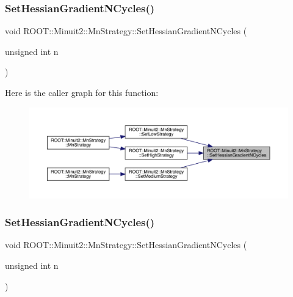 \mbox{\label{classROOT_1_1Minuit2_1_1MnStrategy_ad8984d94901eaf8cad19fe49647449bf}} 
\subsubsection{\texorpdfstring{SetHessianGradientNCycles()}{SetHessianGradientNCycles()}\hspace{0.1cm}{\footnotesize\ttfamily [1/2]}}
{\footnotesize\ttfamily void R\+O\+O\+T\+::\+Minuit2\+::\+Mn\+Strategy\+::\+Set\+Hessian\+Gradient\+N\+Cycles (\begin{DoxyParamCaption}\item[{unsigned int}]{n }\end{DoxyParamCaption})\hspace{0.3cm}{\ttfamily [inline]}}

Here is the caller graph for this function\+:\nopagebreak
\begin{figure}[H]
\begin{center}
\leavevmode
\includegraphics[width=350pt]{da/de4/classROOT_1_1Minuit2_1_1MnStrategy_ad8984d94901eaf8cad19fe49647449bf_icgraph}
\end{center}
\end{figure}
\mbox{\label{classROOT_1_1Minuit2_1_1MnStrategy_ad8984d94901eaf8cad19fe49647449bf}} 
\subsubsection{\texorpdfstring{SetHessianGradientNCycles()}{SetHessianGradientNCycles()}\hspace{0.1cm}{\footnotesize\ttfamily [2/2]}}
{\footnotesize\ttfamily void R\+O\+O\+T\+::\+Minuit2\+::\+Mn\+Strategy\+::\+Set\+Hessian\+Gradient\+N\+Cycles (\begin{DoxyParamCaption}\item[{unsigned int}]{n }\end{DoxyParamCaption})\hspace{0.3cm}{\ttfamily [inline]}}

